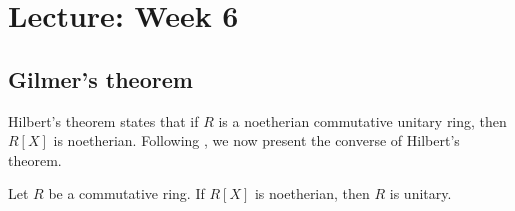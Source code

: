 \section{Lecture: Week 6}



\subsection{Gilmer's theorem}

Hilbert's theorem states that 
if $R$ is a noetherian 
commutative unitary ring, then
$R[X]$ is noetherian. Following \cite{MR212007}, 
we now present the converse of Hilbert's theorem. 

\begin{theorem}[Gilmer]
    Let $R$ be a commutative ring. If $R[X]$ is noetherian, 
    then $R$ is unitary. 
\end{theorem}

